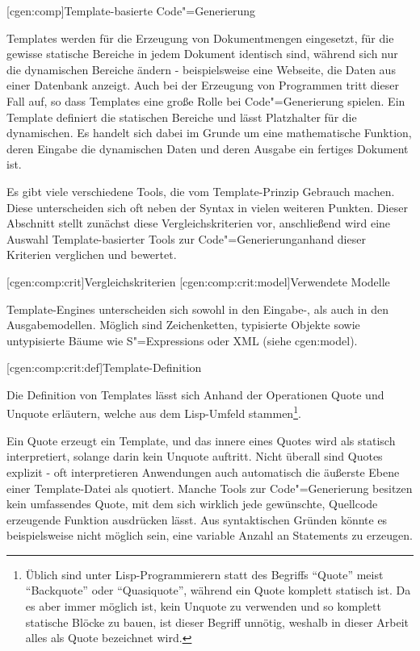 \documentclass[a4paper, bibgerm]{book}
\newcommand\lsection{}
\newcommand\lsubsection{}
\newcommand\lsubsubsection{}
\newcommand\sref{}
\newcommand{\sees}[1]{(siehe \sref{#1})}
\newcommand{\sexps}{S"=Expressions}
\newcommand{\cgen}{Code"=Generierung}
\begin{document}
\lsection[cgen:comp]{Template-basierte \cgen{}}

Templates werden für die Erzeugung von Dokumentmengen eingesetzt, für
die gewisse statische Bereiche in jedem Dokument identisch sind, während
sich nur die dynamischen Bereiche ändern - beispielsweise eine Webseite,
die Daten aus einer Datenbank anzeigt. Auch bei der Erzeugung von
Programmen tritt dieser Fall auf, so dass Templates eine große Rolle bei
\cgen{} spielen. Ein Template definiert die
statischen Bereiche und lässt Platzhalter für die dynamischen. Es
handelt sich dabei im Grunde um eine mathematische Funktion, deren
Eingabe die dynamischen Daten und deren Ausgabe ein fertiges Dokument
ist.

Es gibt viele verschiedene Tools, die vom Template-Prinzip Gebrauch
machen. Diese unterscheiden sich oft neben der Syntax in vielen weiteren
Punkten. Dieser Abschnitt stellt zunächst diese Vergleichskriterien vor,
anschließend wird eine Auswahl Template-basierter Tools zur \cgen anhand
dieser Kriterien verglichen und bewertet.

\lsubsection[cgen:comp:crit]{Vergleichskriterien}
\lsubsubsection[cgen:comp:crit:model]{Verwendete Modelle}

Template-Engines unterscheiden sich sowohl in den Eingabe-, als auch in
den Ausgabemodellen. Möglich sind Zeichenketten, typisierte Objekte
sowie untypisierte Bäume wie \sexps{} oder XML \sees{cgen:model}.

\lsubsubsection[cgen:comp:crit:def]{Template-Definition}

Die Definition von Templates lässt sich Anhand der Operationen Quote und
Unquote erläutern, welche aus dem Lisp-Umfeld stammen\footnote{Üblich
  sind unter Lisp-Programmierern statt des Begriffs "`Quote"' meist
  "`Backquote"' oder "`Quasiquote"', während ein Quote komplett statisch
  ist. Da es aber immer möglich ist, kein Unquote zu verwenden und so
  komplett statische Blöcke zu bauen, ist dieser Begriff unnötig,
  weshalb in dieser Arbeit alles als Quote bezeichnet wird.}.  

Ein Quote erzeugt ein Template, und das innere eines Quotes wird als
statisch interpretiert, solange darin kein Unquote auftritt. Nicht
überall sind Quotes explizit - oft interpretieren Anwendungen auch
automatisch die äußerste Ebene einer Template-Datei als quotiert. Manche
Tools zur \cgen{} besitzen kein umfassendes Quote, mit dem sich wirklich
jede gewünschte, Quellcode erzeugende Funktion ausdrücken lässt. Aus
syntaktischen Gründen könnte es beispielsweise nicht möglich sein, eine
variable Anzahl an Statements zu erzeugen.
\end{document}
